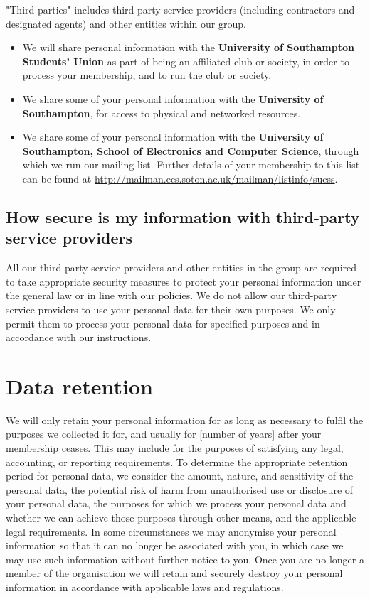 \documentclass[12pt]{article}
\begin{document}
"Third parties" includes third-party service providers (including contractors and designated agents) and other entities within our group. 
\begin{itemize}
\item We will share personal information with the \textbf{University of Southampton Students’ Union} as part of being an affiliated club or society, in order to process your membership, and to run the club or society.
\item We share some of your personal information with the \textbf{University of Southampton}, for access to physical and networked resources.
\item We share some of your personal information with the \textbf{University of Southampton, School of Electronics and Computer Science}, through which we run our mailing list. Further details of your membership to this list can be found at \url{http://mailman.ecs.soton.ac.uk/mailman/listinfo/sucss}.
\end{itemize}

\subsection{How secure is my information with third-party service providers}

All our third-party service providers and other entities in the group are required to take appropriate security measures to protect your personal information under the general law or in line with our policies. We do not allow our third-party service providers to use your personal data for their own purposes. We only permit them to process your personal data for specified purposes and in accordance with our instructions.

\section{Data retention}
We will only retain your personal information for as long as necessary to fulfil the purposes we collected it for, and usually for [number of years] after your membership ceases. This may include for the purposes of satisfying any legal, accounting, or reporting requirements. To determine the appropriate retention period for personal data, we consider the amount, nature, and sensitivity of the personal data, the potential risk of harm from unauthorised use or disclosure of your personal data, the purposes for which we process your personal data and whether we can achieve those purposes through other means, and the applicable legal requirements. 
In some circumstances we may anonymise your personal information so that it can no longer be associated with you, in which case we may use such information without further notice to you. Once you are no longer a member of the organisation we will retain and securely destroy your personal information in accordance with applicable laws and regulations.
\end{document}
